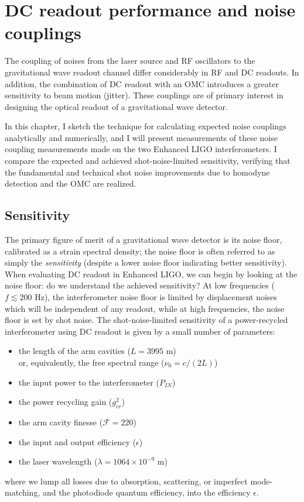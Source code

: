 \chapter{DC readout performance and noise couplings}
\label{chapter5}

The coupling of noises from the laser source and RF oscillators to the
gravitational wave readout channel differ considerably in RF and DC
readouts.  In addition, the combination of DC readout with an OMC
introduces a greater sensitivity to beam motion (jitter).  These
couplings are of primary interest in designing the optical readout of
a gravitational wave detector.  

In this chapter, I sketch the technique for calculating expected noise
couplings analytically and numerically, and I will present
measurements of these noise coupling measurements made on the two
Enhanced LIGO interferometers.  I compare the expected and achieved
shot-noise-limited sensitivity, verifying that the fundamental and
technical shot noise improvements due to homodyne detection and the OMC
are realized.

\section{Sensitivity}

The primary figure of merit of a gravitational wave detector is its
noise floor, calibrated as a strain spectral density; the noise floor
is often referred to as simply the \emph{sensitivity} (despite a lower
noise floor indicating better sensitivity).  When evaluating DC
readout in Enhanced LIGO, we can begin by looking at the noise floor:
do we understand the achieved sensitivity?  At low frequencies
($f\lesssim200\text{ Hz}$), the interferometer noise floor is limited
by displacement noises which will be independent of any readout, while
at high frequencies, the noise floor is set by shot noise.  The
shot-noise-limited sensitivity of a power-recycled interferometer
using DC readout is given by a small number of parameters:

\begin{itemize}
\item the length of the arm cavities ($L = 3995$ m)\\ or,
  equivalently, the free spectral range ($\nu_0 = c/(2L)$)
\item the input power to the interferometer ($P_{IN}$)
\item the power recycling gain ($g_{cr}^2$)
\item the arm cavity finesse ($\mathcal{F} = 220$)
\item the input and output efficiency ($\epsilon$)
\item the laser wavelength ($\lambda = 1064\times10^{-9}$ m)
\end{itemize}
where we lump all losses due to absorption, scattering, or imperfect
mode-matching, and the photodiode quantum efficiency, into the efficiency
$\epsilon$.

